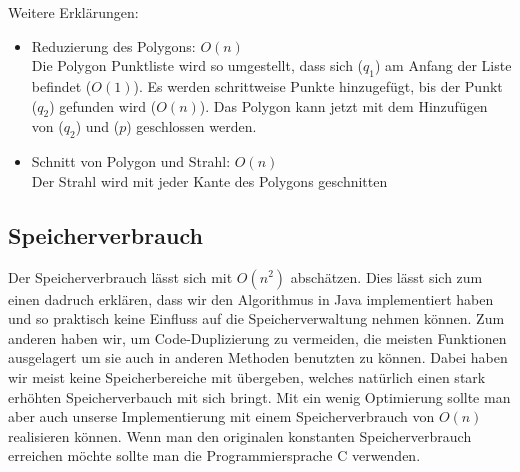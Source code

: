   Weitere Erklärungen:

  \begin{itemize}
  \item Reduzierung des Polygons: $O(n)$\\
        Die Polygon Punktliste wird so umgestellt, dass sich ($q_1$) am Anfang der
        Liste befindet ($O(1)$). Es werden schrittweise Punkte hinzugefügt, bis
        der Punkt ($q_2$) gefunden wird ($O(n)$). Das Polygon kann jetzt mit dem
        Hinzufügen von ($q_2$) und ($p$) geschlossen werden.
  \item Schnitt von Polygon und Strahl: $O(n)$\\
        Der Strahl wird mit jeder Kante des Polygons geschnitten
  \end{itemize}

  \subsection{Speicherverbrauch}

  Der Speicherverbrauch lässt sich mit $O(n^2)$ abschätzen. Dies lässt sich zum
  einen dadruch erklären, dass wir den Algorithmus in Java implementiert haben
  und so praktisch keine Einfluss auf die Speicherverwaltung nehmen können. Zum
  anderen haben wir, um Code-Duplizierung zu vermeiden, die meisten Funktionen
  ausgelagert um sie auch in anderen Methoden benutzten zu können. Dabei haben wir
  meist keine Speicherbereiche mit übergeben, welches natürlich einen stark
  erhöhten Speicherverbauch mit sich bringt. Mit ein wenig Optimierung sollte man
  aber auch unserse Implementierung mit einem Speicherverbrauch von $O(n)$
  realisieren können. Wenn man den originalen konstanten Speicherverbrauch
  erreichen möchte sollte man die Programmiersprache C verwenden.






